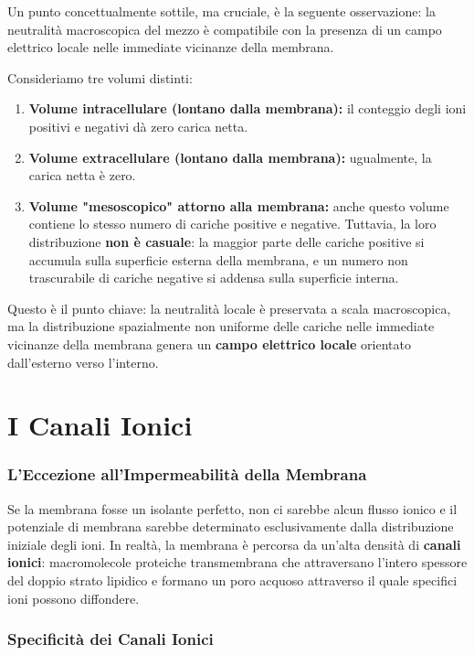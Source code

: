 Un punto concettualmente sottile, ma cruciale, è la seguente osservazione: la neutralità macroscopica del mezzo è compatibile con la presenza di un campo elettrico locale nelle immediate vicinanze della membrana.

Consideriamo tre volumi distinti:

\begin{enumerate}
    \item \textbf{Volume intracellulare (lontano dalla membrana):} il conteggio degli ioni positivi e negativi dà zero carica netta.
    \item \textbf{Volume extracellulare (lontano dalla membrana):} ugualmente, la carica netta è zero.
    \item \textbf{Volume "mesoscopico" attorno alla membrana:} anche questo volume contiene lo stesso numero di cariche positive e negative. Tuttavia, la loro distribuzione \textbf{non è casuale}: la maggior parte delle cariche positive si accumula sulla superficie esterna della membrana, e un numero non trascurabile di cariche negative si addensa sulla superficie interna.
\end{enumerate}

Questo è il punto chiave: la neutralità locale è preservata a scala macroscopica, ma la distribuzione spazialmente non uniforme delle cariche nelle immediate vicinanze della membrana genera un \textbf{campo elettrico locale} orientato dall'esterno verso l'interno. 

\section{I Canali Ionici}

\subsubsection{L'Eccezione all'Impermeabilità della Membrana}

Se la membrana fosse un isolante perfetto, non ci sarebbe alcun flusso ionico e il potenziale di membrana sarebbe determinato esclusivamente dalla distribuzione iniziale degli ioni. In realtà, la membrana è percorsa da un'alta densità di \textbf{canali ionici}: macromolecole proteiche transmembrana che attraversano l'intero spessore del doppio strato lipidico e formano un poro acquoso attraverso il quale specifici ioni possono diffondere.

\subsubsection{Specificità dei Canali Ionici}

